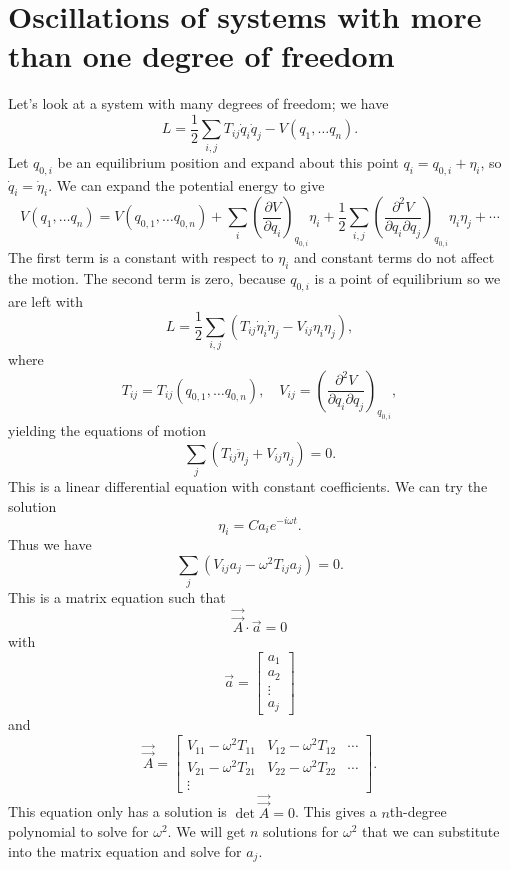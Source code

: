 \section{Oscillations of systems with more than one degree of freedom}
Let's look at a system with many degrees of freedom; we have
\[L={\frac {1}{2}}\sum _{i,j}T_{ij}{\dot {q}}_{i}{\dot {q}}_{j}-V\left(q_{1},\ldots q_{n}\right).\]
Let $q_{0,i}$ be an equilibrium position and expand about this point $q_{i}=q_{0,i}+\eta _{i}$, so $\dot{q}_{i}=\dot {\eta }_{i}$.
We can expand the potential energy to give
\[V\left(q_{1},\ldots q_{n}\right)=V\left(q_{0,1},\ldots q_{0,n}\right)+\sum _{i}\left({\frac {\partial V}{\partial q_{i}}}\right)_{q_{0,i}}\eta _{i}+{\frac {1}{2}}\sum _{i,j}\left({\frac {\partial ^{2}V}{\partial q_{i}\partial q_{j}}}\right)_{q_{0,i}}\eta _{i}\eta _{j}+\cdots \]
The first term is a constant with respect to $\eta_i$ and constant terms do not affect the motion. The second term is zero, because $q_{0,i}$ is a point of equilibrium so we are left with
\[L={\frac {1}{2}}\sum _{i,j}\left(T_{ij}{\dot {\eta }}_{i}{\dot {\eta }}_{j}-V_{ij}\eta _{i}\eta _{j}\right), \]
where
\[T_{ij}=T_{ij}\left(q_{0,1},\ldots q_{0,n}\right) ,\quad V_{ij}=\left({\frac {\partial ^{2}V}{\partial q_{i}\partial q_{j}}}\right)_{q_{0,i}},\]
yielding the equations of motion
\[\sum _{j}\left(T_{ij}{\ddot {\eta }}_{j} + V_{ij}\eta _{j}\right)=0.\]
This is a linear differential equation with constant coefficients. We can try the solution
\[\eta _{i}=Ca_{i}e^{-i\omega t}.\]
Thus we have
\[\sum _{j}\left(V_{ij}a_{j}-\omega ^{2}T_{ij}a_{j}\right)=0.\]
This is a matrix equation such that
\[{\vec {\vec {A}}}\cdot {\vec {a}}=0 \]
with
\[{\vec {a}}=\left[{\begin{matrix}a_{1}\\a_{2}\\\vdots \\a_{j}\end{matrix}}\right] \]
and
\[{\vec {\vec {A}}}=\left[{\begin{matrix}V_{11}-\omega ^{2}T_{11}&V_{12}-\omega ^{2}T_{12}&\cdots \\V_{21}-\omega ^{2}T_{21}&V_{22}-\omega ^{2}T_{22}&\cdots \\\vdots &&\end{matrix}}\right].\]
This equation only has a solution is $\det {\vec {\vec {A}}}=0$. This gives a $n$th-degree polynomial to solve for $\omega^2$. We will get $n$ solutions for $\omega^2$ that we can substitute into the matrix equation and solve for $a_j$.

